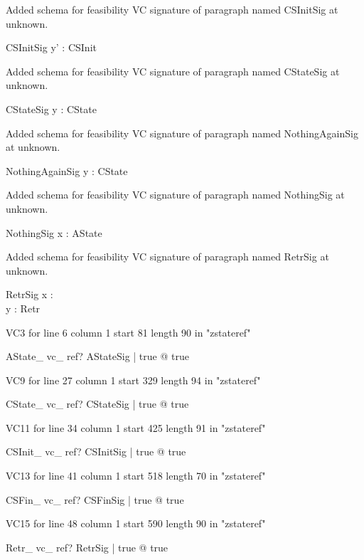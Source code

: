 \documentclass{article}
\begin{document}
Added schema for feasibility VC signature of paragraph named CSInitSig at unknown.
\begin{schema}{CSInitSig}
y' : \seq \nat 
\where
 CSInit
\end{schema}


Added schema for feasibility VC signature of paragraph named CStateSig at unknown.
\begin{schema}{CStateSig}
y : \seq \nat 
\where
 CState
\end{schema}


Added schema for feasibility VC signature of paragraph named NothingAgainSig at unknown.
\begin{schema}{NothingAgainSig}
y : \seq \nat 
\where
 CState
\end{schema}


Added schema for feasibility VC signature of paragraph named NothingSig at unknown.
\begin{schema}{NothingSig}
x : \power \nat 
\where
 AState
\end{schema}


Added schema for feasibility VC signature of paragraph named RetrSig at unknown.
\begin{schema}{RetrSig}
x : \power \nat \\
 y : \seq \nat 
\where
 Retr
\end{schema}

VC3 for line 6 column 1 start 81 length 90 in "zstateref"
\begin{theorem}{AState\_ vc\_ ref}\vdash ? \exists AStateSig | true @ true
\end{theorem}

VC9 for line 27 column 1 start 329 length 94 in "zstateref"
\begin{theorem}{CState\_ vc\_ ref}\vdash ? \exists CStateSig | true @ true
\end{theorem}

VC11 for line 34 column 1 start 425 length 91 in "zstateref"
\begin{theorem}{CSInit\_ vc\_ ref}\vdash ? \exists CSInitSig | true @ true
\end{theorem}

VC13 for line 41 column 1 start 518 length 70 in "zstateref"
\begin{theorem}{CSFin\_ vc\_ ref}\vdash ? \exists CSFinSig | true @ true
\end{theorem}

VC15 for line 48 column 1 start 590 length 90 in "zstateref"
\begin{theorem}{Retr\_ vc\_ ref}\vdash ? \exists RetrSig | true @ true
\end{theorem}
\end{document}
